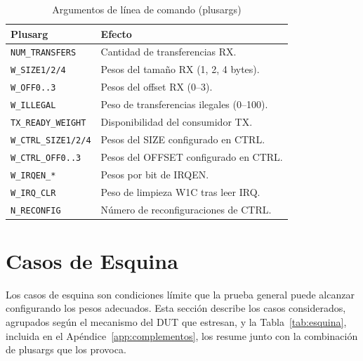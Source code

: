\documentclass[conference]{IEEEtran}
\begin{document}
\begin{table}[H]
\caption{Argumentos de línea de comando (plusargs)}
\label{tab:plusargs}
\centering
\footnotesize
\begin{tabular}{@{}lp{4.6cm}@{}}
\toprule
\textbf{Plusarg} & \textbf{Efecto} \\
\midrule
\texttt{NUM\_TRANSFERS}    & Cantidad de transferencias RX. \\
\texttt{W\_SIZE1/2/4}      & Pesos del tamaño RX (1, 2, 4 bytes). \\
\texttt{W\_OFF0..3}        & Pesos del offset RX (0--3). \\
\texttt{W\_ILLEGAL}        & Peso de transferencias ilegales (0--100). \\
\texttt{TX\_READY\_WEIGHT} & Disponibilidad del consumidor TX. \\
\texttt{W\_CTRL\_SIZE1/2/4}& Pesos del SIZE configurado en CTRL. \\
\texttt{W\_CTRL\_OFF0..3}  & Pesos del OFFSET configurado en CTRL. \\
\texttt{W\_IRQEN\_*}       & Pesos por bit de IRQEN. \\
\texttt{W\_IRQ\_CLR}       & Peso de limpieza W1C tras leer IRQ. \\
\texttt{N\_RECONFIG}       & Número de reconfiguraciones de CTRL. \\
\bottomrule
\end{tabular}
\end{table}

\section{Casos de Esquina}
\label{sec:esquina}

Los casos de esquina son condiciones límite que la prueba general puede alcanzar
configurando los pesos adecuados. Esta sección describe los casos considerados,
agrupados según el mecanismo del DUT que estresan, y la Tabla~\ref{tab:esquina},
incluida en el Apéndice~\ref{app:complementos}, los resume junto con la
combinación de plusargs que los provoca.
\end{document}
